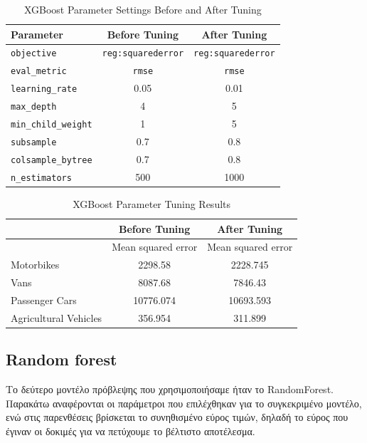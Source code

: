 \documentclass{llncs}
\begin{document}
\begin{table}[h!]
    \centering
    \begin{tabular}{l|cc}
        \hline
        Parameter & Before Tuning & After Tuning \\
        \hline
        \texttt{objective} & \texttt{reg:squarederror} & \texttt{reg:squarederror} \\
        \texttt{eval\_metric} & \texttt{rmse} & \texttt{rmse} \\
        \texttt{learning\_rate} & 0.05 & 0.01 \\
        \texttt{max\_depth} & 4 & 5 \\
        \texttt{min\_child\_weight} & 1 & 5 \\
        \texttt{subsample} & 0.7 & 0.8 \\
        \texttt{colsample\_bytree} & 0.7 & 0.8 \\
        \texttt{n\_estimators} & 500 & 1000 \\
        \hline
    \end{tabular}
    \caption{XGBoost Parameter Settings Before and After Tuning}
\end{table}

\begin{table}[h!]
    \centering
    \begin{tabular}{lcc}
        \hline
        & \multicolumn{1}{c}{Before Tuning} & \multicolumn{1}{c}{After Tuning} \\
        \hline
        & Mean squared error & Mean squared error \\
        \hline
        Motorbikes & 2298.58 & 2228.745  \\
        Vans & 8087.68 & 7846.43 \\
        Passenger Cars & 10776.074  & 10693.593 \\
        Agricultural Vehicles & 356.954 & 311.899\\
        \hline
    \end{tabular}
    \caption{XGBoost Parameter Tuning Results}
\end{table}

\subsection{Random forest}
Το δεύτερο μοντέλο πρόβλεψης που χρησιμοποιήσαμε ήταν το RandomForest. Παρακάτω αναφέρονται οι παράμετροι που επιλέχθηκαν για το συγκεκριμένο μοντέλο, ενώ στις παρενθέσεις βρίσκεται το συνηθισμένο εύρος τιμών, δηλαδή το εύρος που έγιναν οι δοκιμές για να πετύχουμε το βέλτιστο αποτέλεσμα.\\
\end{document}
